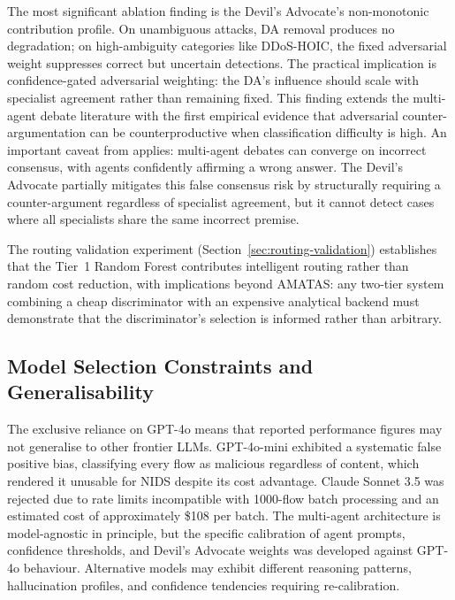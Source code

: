 \documentclass[../main.tex]{subfiles}
\begin{document}
The most significant ablation finding is the Devil's Advocate's non-monotonic contribution profile. On unambiguous attacks, DA removal produces no degradation; on high-ambiguity categories like DDoS-HOIC, the fixed adversarial weight suppresses correct but uncertain detections. The practical implication is confidence-gated adversarial weighting: the DA's influence should scale with specialist agreement rather than remaining fixed. This finding extends the multi-agent debate literature \autocite{Yin2024, Du2023, Chan2023} with the first empirical evidence that adversarial counter-argumentation can be counterproductive when classification difficulty is high. An important caveat from \textcite{Du2023} applies: multi-agent debates can converge on incorrect consensus, with agents confidently affirming a wrong answer. The Devil's Advocate partially mitigates this false consensus risk by structurally requiring a counter-argument regardless of specialist agreement, but it cannot detect cases where all specialists share the same incorrect premise.

The routing validation experiment (Section~\ref{sec:routing-validation}) establishes that the Tier~1 Random Forest contributes intelligent routing rather than random cost reduction, with implications beyond AMATAS: any two-tier system combining a cheap discriminator with an expensive analytical backend must demonstrate that the discriminator's selection is informed rather than arbitrary.

\subsection{Model Selection Constraints and Generalisability}

The exclusive reliance on GPT-4o means that reported performance figures may not generalise to other frontier LLMs. GPT-4o-mini exhibited a systematic false positive bias, classifying every flow as malicious regardless of content, which rendered it unusable for NIDS despite its cost advantage. Claude Sonnet 3.5 was rejected due to rate limits incompatible with 1000-flow batch processing and an estimated cost of approximately \$108 per batch. The multi-agent architecture is model-agnostic in principle, but the specific calibration of agent prompts, confidence thresholds, and Devil's Advocate weights was developed against GPT-4o behaviour. Alternative models may exhibit different reasoning patterns, hallucination profiles, and confidence tendencies requiring re-calibration.
\end{document}
